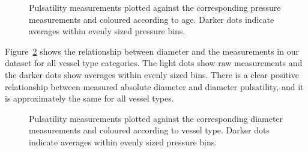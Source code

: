 \documentclass[
  letterpaper,
  DIV=11,
  numbers=noendperiod,
  oneside]{scrartcl}
\theoremstyle{plain}
\theoremstyle{remark}
\begin{document}
\begin{figure}


\caption{\label{fig-pressure-data}Pulsatility measurements plotted
against the corresponding pressure measurements and coloured according
to age. Darker dots indicate averages within evenly sized pressure
bins.}

\end{figure}%

Figure~\ref{fig-diameter-data} shows the relationship between diameter
and the measurements in our dataset for all vessel type categories. The
light dots show raw measurements and the darker dots show averages
within evenly sized bins. There is a clear positive relationship between
measured absolute diameter and diameter pulsatility, and it is
approximately the same for all vessel types.

\begin{figure}


\caption{\label{fig-diameter-data}Pulsatility measurements plotted
against the corresponding diameter measurements and coloured according
to vessel type. Darker dots indicate averages within evenly sized
pressure bins.}

\end{figure}%
\end{document}
